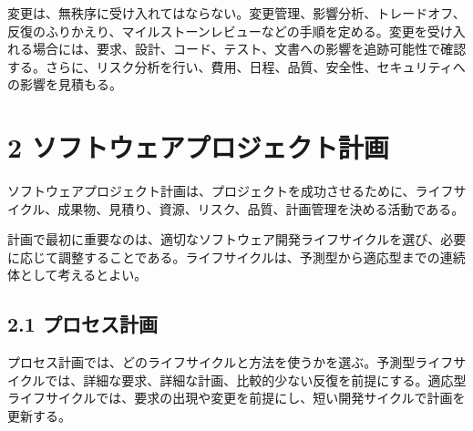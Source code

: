 \documentclass[a4paper,11pt]{ltjsarticle}
\begin{document}
変更は、無秩序に受け入れてはならない。変更管理、影響分析、トレードオフ、反復のふりかえり、マイルストーンレビューなどの手順を定める。変更を受け入れる場合には、要求、設計、コード、テスト、文書への影響を追跡可能性で確認する。さらに、リスク分析を行い、費用、日程、品質、安全性、セキュリティへの影響を見積もる。

\begin{center}
\end{center}

\section{2 ソフトウェアプロジェクト計画}
ソフトウェアプロジェクト計画は、プロジェクトを成功させるために、ライフサイクル、成果物、見積り、資源、リスク、品質、計画管理を決める活動である。

計画で最初に重要なのは、適切なソフトウェア開発ライフサイクルを選び、必要に応じて調整することである。ライフサイクルは、予測型から適応型までの連続体として考えるとよい。

\begin{center}
\end{center}

\subsection{2.1 プロセス計画}
プロセス計画では、どのライフサイクルと方法を使うかを選ぶ。予測型ライフサイクルでは、詳細な要求、詳細な計画、比較的少ない反復を前提にする。適応型ライフサイクルでは、要求の出現や変更を前提にし、短い開発サイクルで計画を更新する。
\end{document}
